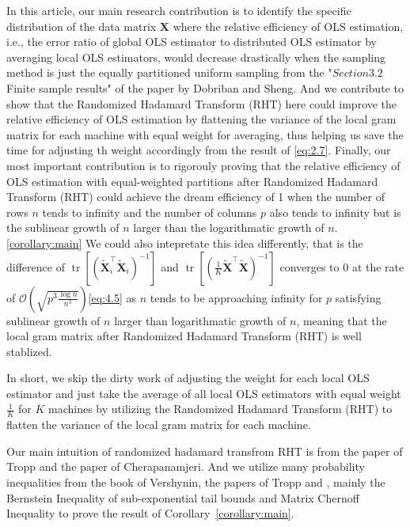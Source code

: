 \documentclass[11pt]{article}
\numberwithin{equation}{section}
\theoremstyle{plain}
\theoremstyle{definition}
\theoremstyle{remark}
\begin{document}
In this article, our main research contribution is to identify the specific distribution of the data matrix $\mathbf{X}$ where the relative efficiency of OLS estimation, i.e., the error ratio of global OLS estimator to distributed OLS estimator by averaging local OLS estimators, would decrease drastically when the sampling method is just the equally partitioned uniform sampling from the "$Section 3.2$ Finite sample results" of the paper by Dobriban and Sheng\cite{dobriban2022distributedlinearregressionaveraging}.
And we contribute to show that the Randomized Hadamard Transform (RHT) here could improve the relative efficiency of OLS estimation by flattening the variance of the local gram matrix for each machine with equal weight for averaging, thus helping us save the time for adjusting th weight accordingly from the result of \ref{eq:2.7}. Finally, our most important contribution is to rigorouly proving that the relative efficiency of OLS estimation with equal-weighted partitions after Randomized Hadamard Transform (RHT) could achieve the dream efficiency of 1 when the number of rows $n$ tends to infinity and the number of columns $p$ also tends to infinity but is the sublinear growth of $n$ larger than the logarithmatic growth of $n$.\ref{corollary:main}
We could also intepretate this idea differently, that is the difference of $\operatorname{tr}[(\tilde{\mathbf{X}}_i^{\top}\tilde{\mathbf{X}}_i)^{-1}]$ and $\operatorname{tr}[(\frac{1}{K}\tilde{\mathbf{X}}^{\top}\tilde{\mathbf{X}})^{-1}]$ converges to $0$ at the rate of $\mathcal{O}(\sqrt{p^{3}\frac{\log n}{n^{3}}})$\ref{eq:4.5} as $n$ tends to be approaching infinity for $p$ satisfying sublinear growth of $n$ larger than logarithmatic growth of $n$, meaning that the local gram matrix after Randomized Hadamard Transform (RHT) is well stablized.

In short, we skip the dirty work of adjusting the weight for each local OLS estimator and just take the average of all local OLS estimators with equal weight $\frac{1}{K}$ for $K$ machines by utilizing the Randomized Hadamard Transform (RHT) to flatten the variance of the local gram matrix for each machine.

Our main intuition of randomized hadamard transfrom {RHT} is from the paper of Tropp\cite{tropp2011improvedanalysissubsampledrandomized} and the paper of Cherapanamjeri\cite{cherapanamjeri2022uniformapproximationsrandomizedhadamard}. And we utilize many probability inequalities from the book of Vershynin\cite{vershynin2018high}, the papers of Tropp\cite{tropp2011improvedanalysissubsampledrandomized} and \cite{Tropp_2011}, mainly the Bernstein Inequality of sub-exponential tail bounds and Matrix Chernoff Inequality to prove the result of Corollary~\ref{corollary:main}.
\end{document}
